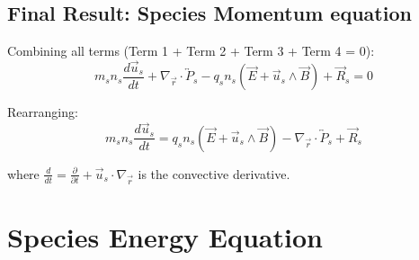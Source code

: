 \subsection{Final Result: Species Momentum equation}

Combining all terms (Term 1 + Term 2 + Term 3 + Term 4 = 0):
\begin{equation*}
m_s n_s \frac{d\vec{u}_s}{dt} + \nabla_{\vec{r}} \cdot \overleftrightarrow{P}_s - q_s n_s (\vec{E} + \vec{u}_s \wedge \vec{B}) + \vec{R}_s = 0
\end{equation*}

Rearranging:
\begin{equation*}
\boxed{m_s n_s \frac{d\vec{u}_s}{dt} = q_s n_s (\vec{E} + \vec{u}_s \wedge \vec{B}) - \nabla_{\vec{r}} \cdot \overleftrightarrow{P}_s + \vec{R}_s}
\end{equation*}

where $\frac{d}{dt} = \frac{\partial}{\partial t} + \vec{u}_s \cdot \nabla_{\vec{r}}$ is the convective derivative.


\section{Species Energy Equation}